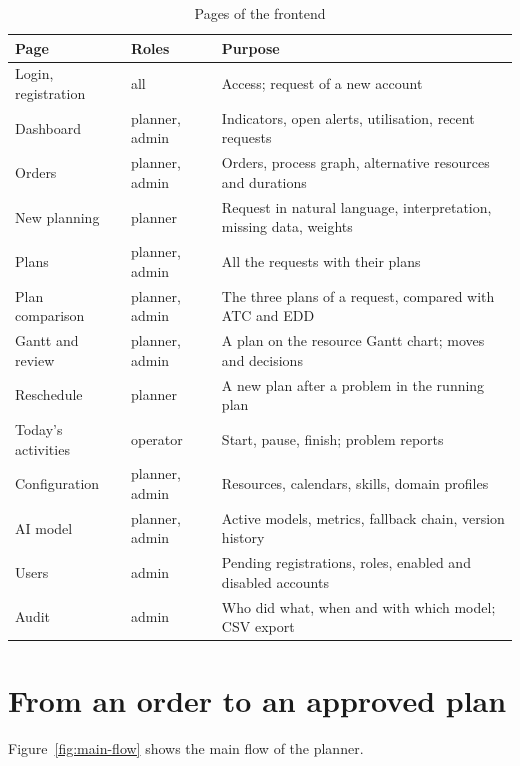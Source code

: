\begin{table}[htpb]
  \centering
  \small
  \begin{tabular}{@{}p{3.4cm}p{2.4cm}p{8cm}@{}}
    \toprule
    \textbf{Page} & \textbf{Roles} & \textbf{Purpose} \\
    \midrule
    Login, registration & all & Access; request of a new account \\
    Dashboard & planner, admin & Indicators, open alerts, utilisation, recent requests \\
    Orders & planner, admin & Orders, process graph, alternative resources and durations \\
    New planning & planner & Request in natural language, interpretation, missing data,
      weights \\
    Plans & planner, admin & All the requests with their plans \\
    Plan comparison & planner, admin & The three plans of a request, compared with ATC and EDD \\
    Gantt and review & planner, admin & A plan on the resource Gantt chart; moves and decisions \\
    Reschedule & planner & A new plan after a problem in the running plan \\
    Today's activities & operator & Start, pause, finish; problem reports \\
    Configuration & planner, admin & Resources, calendars, skills, domain profiles \\
    AI model & planner, admin & Active models, metrics, fallback chain, version history \\
    Users & admin & Pending registrations, roles, enabled and disabled accounts \\
    Audit & admin & Who did what, when and with which model; CSV export \\
    \bottomrule
  \end{tabular}
  \caption{Pages of the frontend}
  \label{tab:pages}
\end{table}

\section{From an order to an approved plan}
\label{sec:ui-main-flow}

Figure~\ref{fig:main-flow} shows the main flow of the planner.


